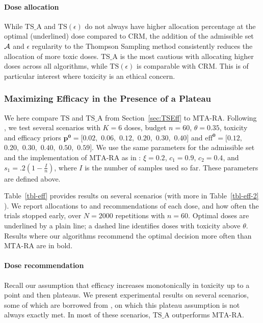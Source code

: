 \paragraph{Dose allocation} While $\mathrm{TS}\_\mathrm{A}$ and $\mathrm{TS}(\epsilon)$ do not always have higher allocation percentage at the optimal (underlined) dose compared to CRM,
the addition of the admissible set $\mathcal{A}$ and $\epsilon$ regularity to the Thompson Sampling method consistently reduces the allocation of more toxic doses. $\mathrm{TS}\_\mathrm{A}$ is the most cautious with allocating higher doses across all algorithms, while $\mathrm{TS}(\epsilon)$ is comparable with CRM. This is of particular interest where toxicity is an ethical concern.

\subsubsection{Maximizing Efficacy in the Presence of a Plateau} \label{subsec:toxOnlyExp}

We here compare $\mathrm{TS}$ and $\mathrm{TS}\_\mathrm{A}$
from Section~\ref{sec:TSEff} to $\mathrm{MTA}$-$\mathrm{RA}$.
Following \cite{MKR17}, we test several scenarios with $K=6$ doses, budget $n=60$, $\theta = 0.35$, toxicity and efficacy priors
$\bm{p^0} = [0.02,$ $0.06,$ $0.12,$ $0.20,$ $0.30,$ $0.40]$ and
$\bm{\mathrm{eff}^0} = [0.12,$ $0.20,$ $0.30,$ $0.40,$ $0.50,$ $0.59]$.
We use the same parameters for the admissible set and the implementation of $\mathrm{MTA}$-$\mathrm{RA}$ as in \cite{MKR17}: $\xi=0.2$, $c_1=0.9$, $c_2=0.4$, and $s_1=.2\left(1-\frac{I}{n}\right)$, where $I$ is the number of samples used so far. These parameters are defined above.
 


Table~\ref{tbl-eff} provides results on several scenarios (with more in Table~\ref{tbl-eff-2} ). We report allocations to and recommendations of each dose, and how often the trials stopped early, over $N=2000$ repetitions with $n=60$.
Optimal doses are underlined by a plain line; a dashed line identifies doses with toxicity above $\theta$. Results where
our algorithms recommend the optimal decision more often than 
$\mathrm{MTA}$-$\mathrm{RA}$ are in bold.

\paragraph{Dose recommendation}  
Recall our assumption that efficacy increases monotonically in toxicity up to a point and then plateaus. We present experimental results on several scenarios, some of which are borrowed from \cite{MKR17}, on which this plateau assumption is not always exactly met. In most of these scenarios, $\mathrm{TS}\_\mathrm{A}$ outperforms $\mathrm{MTA}$-$\mathrm{RA}$. 

